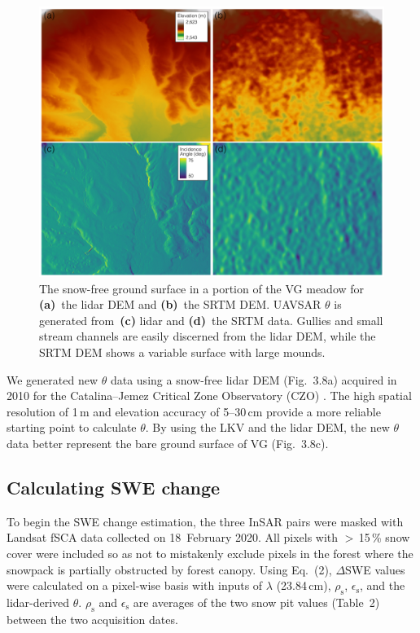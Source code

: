 \begin{figure}[t]
\includegraphics[width=14cm]{figures/ch3_figs/fig08.pdf}
\caption{The snow-free ground surface in a portion of the VG meadow for \textbf{(a)}~the lidar DEM and \textbf{(b)}~the SRTM DEM. UAVSAR $\theta$ is generated from~\textbf{(c)} lidar and \textbf{(d)}~the SRTM data. Gullies and small stream channels are easily discerned from the lidar DEM, while the SRTM DEM shows a variable surface with large mounds.}
\end{figure}

We generated new $\theta$ data using a snow-free lidar DEM (Fig.~3.8a) acquired in 2010 for the Catalina--Jemez Critical Zone Observatory (CZO) \citep{opentopographyJemezRiverBasin2012}. The high spatial resolution of 1\,m and elevation accuracy of 5--30\,cm provide a more reliable starting point to calculate $\theta$. By using the LKV and the lidar DEM, the new $\theta$ data better represent the bare ground surface of VG (Fig.~3.8c).


\hypertarget{ch3-methods-12}{\subsection{Calculating SWE change}\label{ch3-methods-12}}


To begin the SWE change estimation, the three InSAR pairs were masked with Landsat fSCA data collected on 18~February 2020. All pixels with $>$\,15\,\% snow cover were included so as not to mistakenly exclude pixels in the forest where the snowpack is partially obstructed by forest canopy. Using Eq.~(2), $\Delta$SWE values were calculated on a pixel-wise basis with inputs of $\lambda$ (23.84\,cm), $\rho_\mathrm{s}$, $\epsilon_\mathrm{s}$, and the lidar-derived $\theta$. $\rho_\mathrm{s}$ and $\epsilon_\mathrm{s}$ are averages of the two snow pit values (Table~2) between the two acquisition dates.

